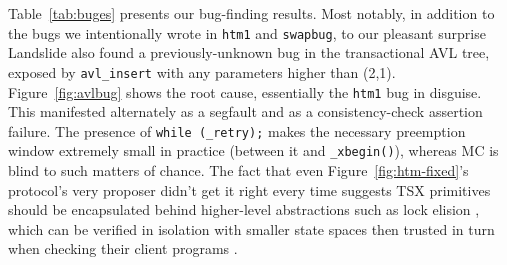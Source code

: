 \documentclass{article}
\begin{document}
Table~\ref{tab:buges}
presents our bug-finding results.
%
Most notably,
in addition to the bugs we intentionally wrote in {\tt htm1} and {\tt swapbug},
to our pleasant surprise
Landslide also found a previously-unknown bug in the transactional AVL tree,
exposed by {\tt avl\_insert} with any parameters higher than (2,1).
Figure~\ref{fig:avlbug} shows the root cause, essentially the {\tt htm1} bug in disguise.
This manifested
alternately
as a segfault
and
as a consistency-check assertion failure.
The presence of {\tt while (\_retry);} makes the necessary preemption window extremely small
in practice (between it and {\tt \_xbegin()}),
whereas MC is blind to such matters of chance.%
The fact that even Figure~\ref{fig:htm-fixed}'s protocol's very proposer %
didn't get it right every time %
suggests TSX primitives should be encapsulated behind higher-level abstractions
such as lock elision \cite{lock-elision},
which can be verified in isolation with smaller state spaces
then trusted in turn when checking their client programs \cite{dbug-phdthesis}.
\end{document}
